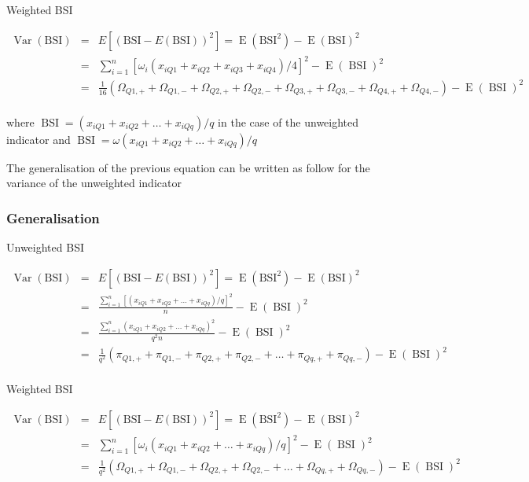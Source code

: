 \documentclass[12pt,a4paper,oneside]{book}
\DeclareMathOperator{\Var}{Var}
\DeclareMathOperator{\E}{E}
\DeclareMathOperator{\BSI}{BSI}
\begin{document}
Weighted BSI

\begin{eqnarray}
         \Var(\text{BSI}) &=& E \left[ \left(\text{BSI}-E(\text{BSI}) \right)^2 \right] =  \E \left( \text{BSI}^2\right) - \E \left( \text{BSI}\right)^2 \\ 
         &=&  \sum^n_{i=1} \left[\omega_i (x_{iQ1} + x_{iQ2} + x_{iQ3} + x_{iQ4})/4 \right]^2 - \E (\BSI)^2 \\
         &=& \frac{1}{16} \left( \Omega_{Q1,+} + \Omega_{Q1,-} + \Omega_{Q2,+} + \Omega_{Q2,-} + \Omega_{Q3,+} + \Omega_{Q3,-} + \Omega_{Q4,+} + \Omega_{Q4,-} \right) - \E (\BSI)^2 \nonumber \\ 
\end{eqnarray}

where $\BSI = \left(x_{i Q1} + x_{i Q2} + \ldots + x_{i Qq} \right) / q $ in the case of the unweighted indicator and $\BSI = \omega \left(x_{i Q1} + x_{i Q2} + \ldots + x_{i Qq} \right) / q $


The generalisation of the previous equation can be written as follow for the variance of the unweighted indicator


\subsubsection{Generalisation}

Unweighted BSI

\begin{eqnarray}
         \Var(\text{BSI}) &=& E \left[ \left(\text{BSI}-E(\text{BSI}) \right)^2 \right] =  \E \left( \text{BSI}^2\right) - \E \left( \text{BSI}\right)^2 \\ 
         &=&  \frac{\sum^n_{i=1}[(x_{iQ1} + x_{iQ2} + \ldots + x_{iQq})/q]^2}{n} - \E (\BSI)^2 \\
        &=&  \frac{\sum^n_{i=1}(x_{iQ1} + x_{iQ2} + \ldots + x_{iQq})^2}{q^2 n} - \E (\BSI)^2 \\
        &=& \frac{1}{q^2} \left( \pi_{Q1,+} + \pi_{Q1,-} + \pi_{Q2,+} + \pi_{Q2,-} + \ldots + \pi_{Qq,+} + \pi_{Qq,-} \right) - \E (\BSI)^2 \nonumber \\ 
\end{eqnarray}

Weighted BSI

\begin{eqnarray}
         \Var(\text{BSI}) &=& E \left[ \left(\text{BSI}-E(\text{BSI}) \right)^2 \right] =  \E \left( \text{BSI}^2\right) - \E \left( \text{BSI}\right)^2 \\ 
         &=&  \sum^n_{i=1} \left[\omega_i (x_{iQ1} + x_{iQ2} + \ldots + x_{iQq})/q \right]^2 - \E (\BSI)^2 \\
         &=& \frac{1}{q^2} \left( \Omega_{Q1,+} + \Omega_{Q1,-} + \Omega_{Q2,+} + \Omega_{Q2,-} + \ldots + \Omega_{Qq,+} + \Omega_{Qq,-} \right) - \E (\BSI)^2 \nonumber \\ 
\end{eqnarray}
\end{document}
